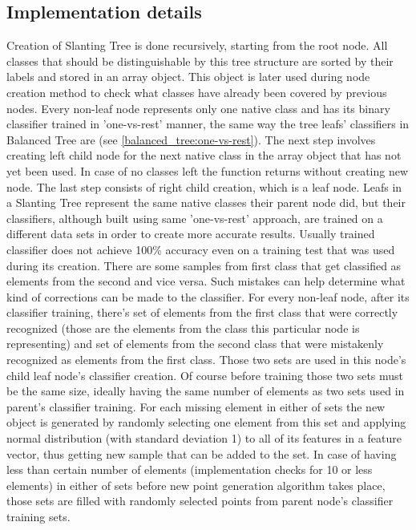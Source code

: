 \subsection{Implementation details}

Creation of Slanting Tree is done recursively, starting from the root node. All classes that should be distinguishable by this tree structure are sorted by their labels and stored in an array object. This object is later used during node creation method to check what classes have already been covered by previous nodes. Every non-leaf node represents only one native class and has its binary classifier trained in 'one-vs-rest' manner, the same way the tree leafs' classifiers in Balanced Tree are (see \ref{balanced_tree:one-vs-rest}). The next step involves creating left child node for the next native class in the array object that has not yet been used. In case of no classes left the function returns without creating new node. The last step consists of right child creation, which is a leaf node. Leafs in a Slanting Tree represent the same native classes their parent node did, but their classifiers, although built using same 'one-vs-rest' approach, are trained on a different data sets in order to create more accurate results. Usually trained classifier does not achieve 100\% accuracy even on a training test that was used during its creation. There are some samples from first class that get classified as elements from the second and vice versa. Such mistakes can help determine what kind of corrections can be made to the classifier. For every non-leaf node, after its classifier training, there's set of elements from the first class that were correctly recognized (those are the elements from the class this particular node is representing) and set of elements from the second class that were mistakenly recognized as elements from the first class. Those two sets are used in this node's child leaf node's classifier creation. Of course before training those two sets must be the same size, ideally having the same number of elements as two sets used in parent's classifier training. For each missing element in either of sets the new object is generated by randomly selecting one element from this set and applying normal distribution (with standard deviation 1) to all of its features in a feature vector, thus getting new sample that can be added to the set. In case of having less than certain number of elements (implementation checks for 10 or less elements) in either of sets before new point generation algorithm takes place, those sets are filled with randomly selected points from parent node's classifier training sets.
